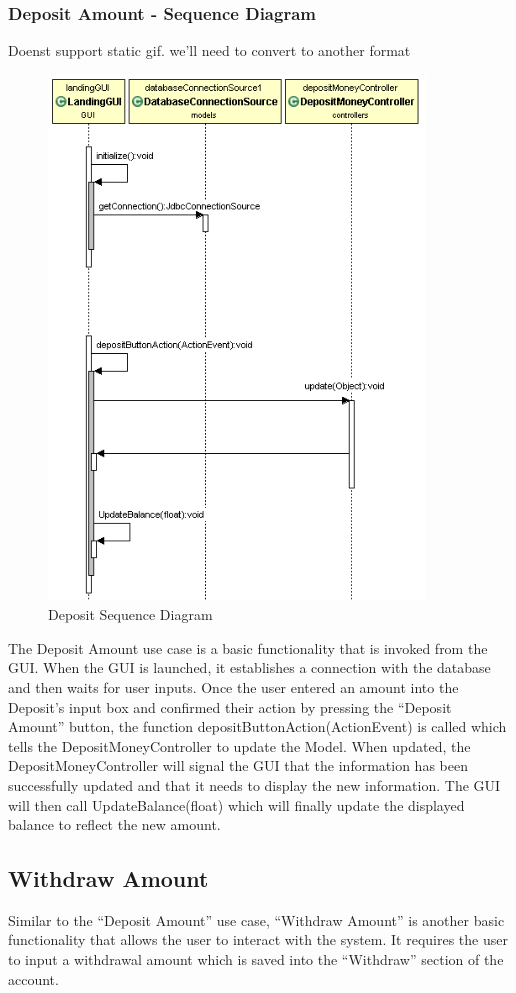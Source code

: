 \documentclass[12pt]{article}
\begin{document}
\subsubsection{Deposit Amount - Sequence Diagram}
 Doenst support static gif. we'll need to convert to another format
\begin{figure}[h!]
  \centering
  \includegraphics[width=100mm]{deposit_sequence.png}
  \caption{Deposit Sequence Diagram}
\end{figure}
The Deposit Amount use case is a basic functionality that is invoked from the GUI. When the GUI is launched, it establishes a connection with the database and then waits for user inputs. Once the user entered an amount into the Deposit’s input box and confirmed their action by pressing the “Deposit Amount” button, the function depositButtonAction(ActionEvent) is called which tells the DepositMoneyController to update the Model. When updated, the DepositMoneyController will signal the GUI that the information has been successfully updated and that it needs to display the new information. The GUI will then call UpdateBalance(float) which will finally update the displayed balance to reflect the new amount.


\subsection{Withdraw Amount}
Similar to the “Deposit Amount” use case, “Withdraw Amount” is another basic functionality that allows the user to interact with the system. It requires the user to input a withdrawal amount which is saved into the “Withdraw” section of the account. 
\end{document}

